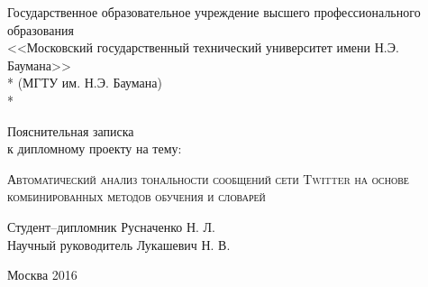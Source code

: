 \begin{titlepage}
\newpage

\begin{center}
Государственное образовательное учреждение высшего профессионального образования \\
\vspace{1cm}
\Large<<Московский государственный технический университет имени Н.Э. Баумана>> \\*
(МГТУ им. Н.Э. Баумана) \\*
\hrulefill
\end{center}


\vspace{1em}

\begin{center}
\Large Пояснительная записка \\ к дипломному проекту на тему:
\end{center}

\vspace{2.0em}

\begin{center}
	\Large
    \textsc{ Автоматический анализ тональности сообщений сети Twitter на основе
        комбинированных методов обучения и словарей }
\end{center}

\vspace{4em}

\begin{flushleft}
Студент--дипломник \hrulefill \hspace{1pt} Русначенко Н. Л. \\
\vspace{1.5em}
Научный руководитель \hrulefill \hspace{1pt} Лукашевич Н. В.\\
\vspace{1.5em}
\end{flushleft}

\vspace{\fill}

\begin{center}
Москва 2016
\end{center}

\end{titlepage}
